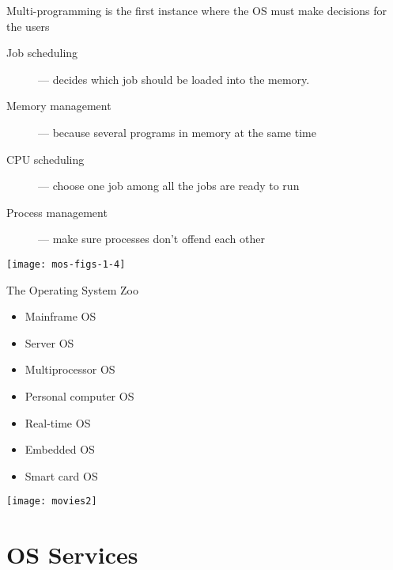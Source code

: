 \begin{frame}
  \begin{block}{Multi-programming is the first instance where the OS must make decisions
      for the users}
    \begin{minipage}{.65\linewidth}
      \begin{description}
      \item[Job scheduling] --- decides which job should be loaded into the memory.
      \item[Memory management] --- because several programs in memory at the same time
      \item[CPU scheduling] --- choose one job among all the jobs are ready to run
      \item[Process management] --- make sure processes don't offend each other
      \end{description}
    \end{minipage}\quad
    \begin{minipage}{.3\linewidth}
      \texttt{[image: mos-figs-1-4]}
    \end{minipage}
  \end{block}
\end{frame}

\begin{frame}{The Operating System Zoo}
  \begin{minipage}{.45\linewidth}
    \begin{itemize}
    \item {\huge Mainframe OS}
    \item {\LARGE Server OS}
    \item {\Large Multiprocessor OS}
    \item {\large Personal computer OS}
    \item Real-time OS
    \item {\small Embedded OS}
    \item {\scriptsize Smart card OS}
    \end{itemize}
  \end{minipage}\quad
  \begin{minipage}{.45\linewidth}
    \texttt{[image: movies2]}
  \end{minipage}
\end{frame}

\section{OS Services}

